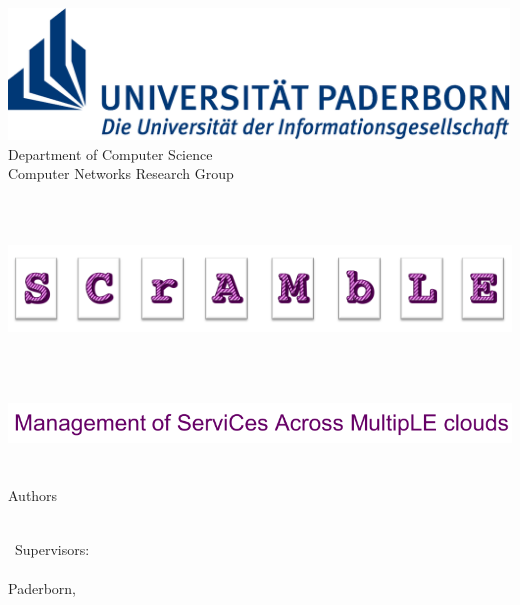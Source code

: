 
\begin{titlepage}	
	\begin{center}
		\begin{minipage}{135mm}
			\centering
			\includegraphics[height=35mm]{figures/uni-logo}			
			\textsf{
				\hspace*{8mm} 
				\Large Department of Computer Science\\
				\hspace*{8mm} Computer Networks Research Group \\
			}		
		\end{minipage}\\[40pt]
		
		
		

		{\Huge\textbf{\thetitle{}}}

	\begin{minipage}{4000mm}
	\hspace*{-1.3cm} 
	\includegraphics[height=30mm]{figures/CuK-Logo2_rot}
\end{minipage}\\[10pt]

\begin{minipage}{4000mm}
	\hspace*{-1cm} 
	\includegraphics[height=13.5mm]{figures/subtitle}
\end{minipage}\\[10pt]

		\huge Authors\vspace{4mm}
	
		{\huge \textsc{\theauthor{}}}\\[30pt]

		\ Supervisors:\\
		
		{\huge \textsc \thesupervisor{}}\\[30pt]

		Paderborn, \thesubmissiondate{}
	\end{center}
\end{titlepage}



